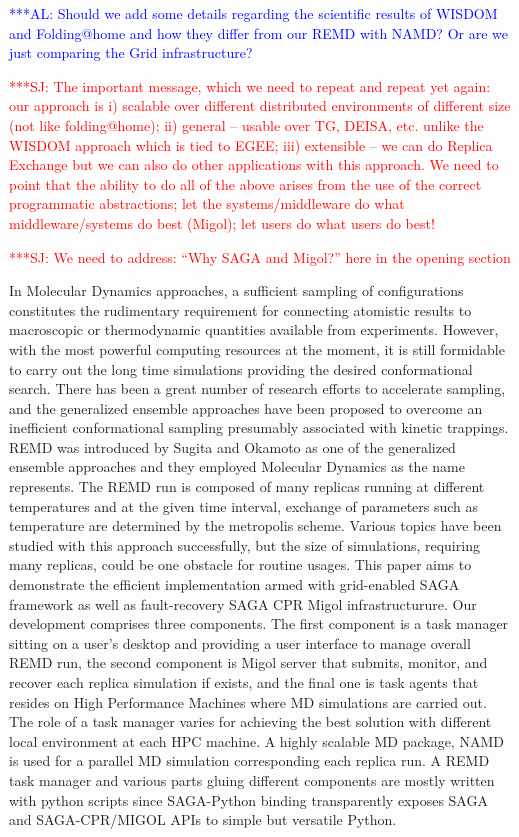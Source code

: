 \documentclass[times, 10pt,twocolumn]{article}
\newcommand{\alnote}[1]{ {\textcolor{blue} { ***AL: #1 }}}
\newcommand{\jhanote}[1]{ {\textcolor{red} { ***SJ: #1 }}}
\begin{document}
  \alnote{Should we add some details regarding the scientific results
    of WISDOM and Folding@home and how they differ from our REMD with
    NAMD?  Or are we just comparing the Grid infrastructure?}

  \jhanote{The important message, which we need to repeat and repeat
    yet again: our approach is i) scalable over different distributed
    environments of different size (not like folding@home); ii)
    general -- usable over TG, DEISA, etc. unlike the WISDOM approach
    which is tied to EGEE; iii) extensible -- we can do Replica
    Exchange but we can also do other applications with this
    approach. We need to point that the ability to do all of the above
    arises from the use of the correct programmatic abstractions; let
    the systems/middleware do what middleware/systems do best (Migol);
    let users do what users do best!}

  \jhanote{We need to address: ``Why SAGA and Migol?'' here in the
    opening section}




In Molecular Dynamics approaches, a sufficient sampling of configurations constitutes the rudimentary requirement for connecting atomistic results to macroscopic or thermodynamic quantities available from experiments.   However,  with the most powerful computing resources at the moment, it is still formidable to carry out the long time simulations providing the desired conformational search.   There has been a great number of research efforts to accelerate sampling, and the generalized ensemble approaches have been proposed to overcome an inefficient conformational sampling presumably associated with kinetic trappings.  REMD was introduced by Sugita and Okamoto as one of the generalized ensemble approaches and they employed Molecular Dynamics as the name represents.  The REMD run is composed of many replicas running at different temperatures and at the given time interval, exchange of parameters such as temperature are determined by the metropolis scheme.  Various topics have been studied with this approach successfully, but the size of simulations, requiring many replicas, could be one obstacle for routine usages.  This paper aims to demonstrate the efficient implementation armed with grid-enabled SAGA framework as well as fault-recovery SAGA CPR Migol infrastructurure.  Our development comprises three components.  The first component is a task manager sitting on a user's desktop and providing a user interface to manage overall REMD run, the second component is Migol server that submits, monitor, and recover each replica simulation if exists, and the final one is task agents that resides on High Performance Machines where MD simulations are carried out.  The role of a task manager varies for achieving the best solution with different local environment at each HPC machine.  A highly scalable MD package, NAMD~\cite{Phillips:2005gd} is used for a parallel MD simulation corresponding each replica run.  A REMD task manager and various parts gluing different components are mostly written with python scripts since SAGA-Python binding transparently exposes SAGA and SAGA-CPR/MIGOL APIs to simple but versatile Python.
\end{document}
